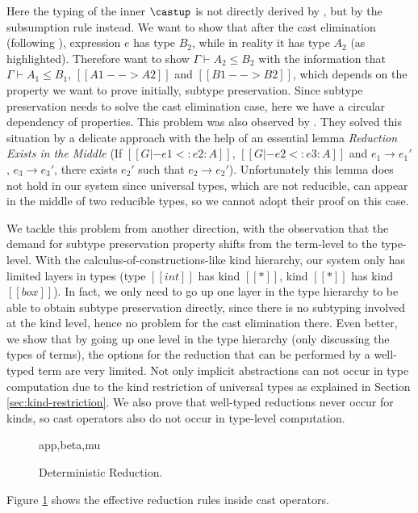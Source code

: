 Here the typing of the inner $\castup$ is not directly derived by
, but by the subsumption rule instead. We want to show that after
the cast elimination (following ), expression $e$ has type $B_2$,
while in reality it has type $A_2$ (as highlighted).
Therefore want to show $\Gamma \vdash A_2 \le B_2$ with the information that
$\Gamma \vdash A_1 \le B_1$, $[[A1 --> A2]]$
and $[[B1 --> B2]]$, which depends on the property we want to prove initially,
subtype preservation.
Since subtype preservation needs to solve the cast elimination case, here we have a
circular dependency of properties.
This problem was also observed by \cite{full}. They solved this situation
by a delicate approach with the help of an essential lemma
\emph{Reduction Exists in the Middle} (If $[[G |- e1 <: e2 : A]]$, $[[G |- e2 <: e3 : A]]$
and $e_1 \longrightarrow e_1'$, $e_3 \longrightarrow e_3'$, there exists $e_2'$
such that $e_2 \longrightarrow e_2'$). Unfortunately this lemma does not hold
in our system since universal types, which are not reducible, can appear in the
middle of two reducible types, so we cannot adopt their proof on this case.

We tackle this problem from another direction, with the observation that the
demand for subtype preservation property shifts from the term-level to the type-level.
With the calculus-of-constructions-like kind hierarchy, our system only has
limited layers in types (type $[[int]]$ has kind $[[*]]$, kind $[[*]]$ has kind $[[box]]$).
In fact, we only need to go up one layer in the type hierarchy to be able to
obtain subtype preservation directly,
since there is no subtyping involved at the kind level,
hence no problem for the cast elimination there.
Even better, we show that by going up one level in the type hierarchy
(only discussing the types of terms), the options
for the reduction that can be performed by a well-typed term are very limited.
Not only implicit abstractions can not occur in type computation due to the kind
restriction of universal types as explained in Section \ref{sec:kind-restriction}.
We also prove that well-typed reductions never occur
for kinds, so cast operators also do not occur in type-level computation.

\begin{figure}
      {app,beta,mu}
    \caption{Deterministic Reduction.}
    \label{fig:deterministic-reduction}
\end{figure}

Figure \ref{fig:deterministic-reduction} shows the effective reduction rules
inside cast operators.


